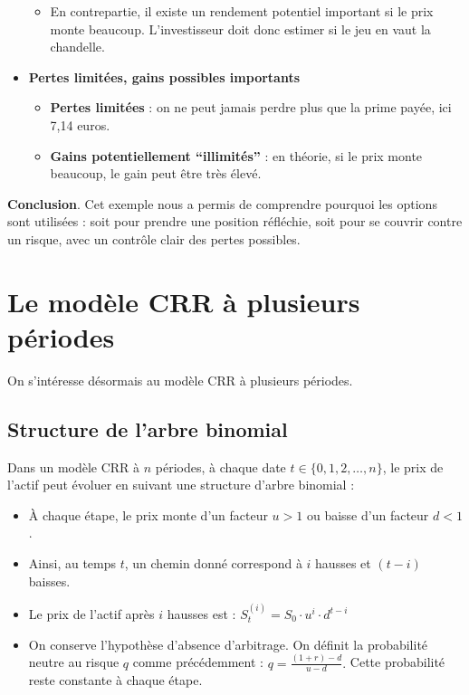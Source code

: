 \documentclass[12pt,a4paper]{article}
\newcommand{\quotes}[1]{``#1''}
\begin{document}
\begin{itemize}
\begin{itemize}
        \item En contrepartie, il existe un rendement potentiel important si le prix monte beaucoup. L’investisseur doit donc estimer si le jeu en vaut la chandelle.
    \end{itemize}

    \item \textbf{Pertes limitées, gains possibles importants}

    \begin{itemize}
        \item \textbf{Pertes limitées} : on ne peut jamais perdre plus que la prime payée, ici 7,14 euros.
        
        \item \textbf{Gains potentiellement \quotes{illimités}} : en théorie, si le prix monte beaucoup, le gain peut être très élevé.
    \end{itemize}
\end{itemize}

\textbf{Conclusion}. Cet exemple nous a permis de comprendre pourquoi les options sont utilisées : soit pour prendre une position réfléchie, soit pour se couvrir contre un risque, avec un contrôle clair des pertes possibles.

\section{Le modèle CRR à plusieurs périodes}

On s'intéresse désormais au modèle CRR à plusieurs périodes.

\subsection{Structure de l'arbre binomial}
Dans un modèle CRR à $n$ périodes, à chaque date $t \in \{0,1,2,\dots,n\}$, le prix de l'actif peut évoluer en suivant une structure d'arbre binomial :

\begin{itemize}
    \item À chaque étape, le prix monte d'un facteur $u > 1$ ou baisse d'un facteur $d < 1$.
    \item Ainsi, au temps $t$, un chemin donné correspond à $i$ hausses et $(t-i)$ baisses.
    \item Le prix de l'actif après $i$ hausses est :
    \(
    \boxed{S_t^{(i)} = S_0 \cdot u^i \cdot d^{t-i}}
    \)
    \item On conserve l'hypothèse d'absence d'arbitrage. On définit la probabilité neutre au risque $q$ comme précédemment :
    \(
    q = \frac{(1 + r) - d}{u - d}.
    \)
    Cette probabilité reste constante à chaque étape.
\end{itemize}
\end{document}
